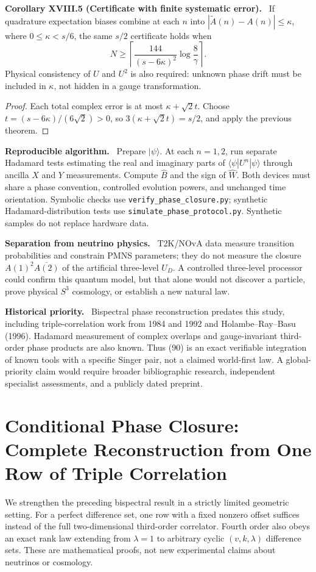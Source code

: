 \documentclass[11pt,a4paper,oneside]{book}
\newcommand{\statement}[3]{\par\medskip\noindent\textbf{#1 #2 (#3).}\ }
\newcommand{\note}[1]{\par\medskip\noindent\textbf{#1}\ }
\begin{document}
\statement{Corollary}{XVIII.5}{Certificate with finite systematic error} If quadrature expectation biases combine at each $n$ into $|\widetilde A(n)-A(n)|\le\kappa$, where $0\le\kappa<s/6$, the same $s/2$ certificate holds when
\[N\ge\left\lceil\frac{144}{(s-6\kappa)^2}\log\frac8\gamma\right\rceil.\]
Physical consistency of $U$ and $U^2$ is also required: unknown phase drift must be included in $\kappa$, not hidden in a gauge transformation.
\begin{proof}Each total complex error is at most $\kappa+\sqrt2t$. Choose $t=(s-6\kappa)/(6\sqrt2)>0$, so $3(\kappa+\sqrt2t)=s/2$, and apply the previous theorem.\end{proof}
\note{Reproducible algorithm.} Prepare $|\psi\rangle$. At each $n=1,2$, run separate Hadamard tests estimating the real and imaginary parts of $\langle\psi|U^n|\psi\rangle$ through ancilla $X$ and $Y$ measurements. Compute $\widehat B$ and the sign of $\widehat W$. Both devices must share a phase convention, controlled evolution powers, and unchanged time orientation. Symbolic checks use \texttt{verify\_phase\_closure.py}; synthetic Hadamard-distribution tests use \texttt{simulate\_phase\_protocol.py}. Synthetic samples do not replace hardware data.
\note{Separation from neutrino physics.} T2K/NOvA data measure transition probabilities and constrain PMNS parameters; they do not measure the closure $A(1)^2\overline{A(2)}$ of the artificial three-level $U_D$. A controlled three-level processor could confirm this quantum model, but that alone would not discover a particle, prove physical $S^3$ cosmology, or establish a new natural law.
\note{Historical priority.} Bispectral phase reconstruction predates this study, including triple-correlation work from 1984 and 1992 and Holambe--Ray--Basu (1996). Hadamard measurement of complex overlaps and gauge-invariant third-order phase products are also known. Thus (90) is an exact verifiable integration of known tools with a specific Singer pair, not a claimed world-first law. A global-priority claim would require broader bibliographic research, independent specialist assessments, and a publicly dated preprint.
\chapter{Conditional Phase Closure: Complete Reconstruction from One Row of Triple Correlation}
We strengthen the preceding bispectral result in a strictly limited geometric setting. For a perfect difference set, one row with a fixed nonzero offset suffices instead of the full two-dimensional third-order correlator. Fourth order also obeys an exact rank law extending from $\lambda=1$ to arbitrary cyclic $(v,k,\lambda)$ difference sets. These are mathematical proofs, not new experimental claims about neutrinos or cosmology.
\end{document}
